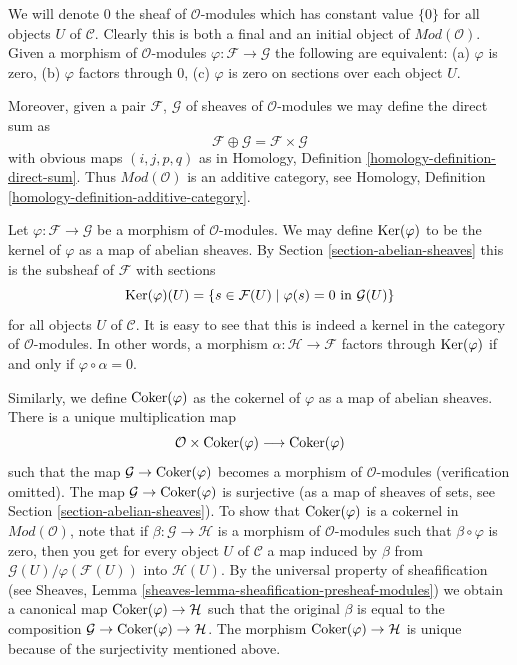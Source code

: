\medskip\noindent
We will denote $0$ the sheaf of $\mathcal{O}$-modules
which has constant value $\{0\}$ for all objects $U$ of $\mathcal{C}$.
Clearly this is both a final and an initial object of
$\textit{Mod}(\mathcal{O})$. Given a morphism
of $\mathcal{O}$-modules $\varphi : \mathcal{F} \to \mathcal{G}$
the following are equivalent:
(a) $\varphi$ is zero, (b) $\varphi$ factors through $0$,
(c) $\varphi$ is zero on sections over each object $U$.

\medskip\noindent
Moreover, given a pair
$\mathcal{F}$, $\mathcal{G}$ of sheaves of $\mathcal{O}$-modules
we may define the direct sum as
$$
\mathcal{F} \oplus \mathcal{G} = \mathcal{F} \times \mathcal{G}
$$
with obvious maps $(i, j, p, q)$ as in Homology, Definition
\ref{homology-definition-direct-sum}. Thus $\textit{Mod}(\mathcal{O})$
is an additive category, see
Homology, Definition \ref{homology-definition-additive-category}.

\medskip\noindent
Let $\varphi : \mathcal{F} \to \mathcal{G}$ be a morphism
of $\mathcal{O}$-modules. We may define $\mathop{\mathrm{Ker}}(\varphi)$
to be the kernel of $\varphi$ as a map of abelian sheaves.
By Section \ref{section-abelian-sheaves} this is the
subsheaf of $\mathcal{F}$ with sections
$$
\mathop{\mathrm{Ker}}(\varphi)(U) =
\{ s \in \mathcal{F}(U) \mid \varphi(s) = 0 \text{ in } \mathcal{G}(U)\}
$$
for all objects $U$ of $\mathcal{C}$. It is easy to see that this is indeed
a kernel in the category of $\mathcal{O}$-modules. In other words,
a morphism $\alpha : \mathcal{H} \to \mathcal{F}$ factors
through $\mathop{\mathrm{Ker}}(\varphi)$ if and only if $\varphi \circ \alpha = 0$.

\medskip\noindent
Similarly, we define $\mathop{\mathrm{Coker}}(\varphi)$ as the cokernel of
$\varphi$ as a map of abelian sheaves. There is a unique
multiplication map
$$
\mathcal{O} \times \mathop{\mathrm{Coker}}(\varphi) \longrightarrow \mathop{\mathrm{Coker}}(\varphi)
$$
such that the map $\mathcal{G} \to \mathop{\mathrm{Coker}}(\varphi)$ becomes a
morphism of $\mathcal{O}$-modules (verification omitted).
The map $\mathcal{G} \to \mathop{\mathrm{Coker}}(\varphi)$ is surjective
(as a map of sheaves of sets, see Section \ref{section-abelian-sheaves}).
To show that $\mathop{\mathrm{Coker}}(\varphi)$ is a cokernel in
$\textit{Mod}(\mathcal{O})$, note that if
$\beta : \mathcal{G} \to \mathcal{H}$ is a morphism of $\mathcal{O}$-modules
such that $\beta \circ \varphi$ is zero, then you get for every
object $U$ of $\mathcal{C}$ a map induced by $\beta$ from
$\mathcal{G}(U)/\varphi(\mathcal{F}(U))$ into $\mathcal{H}(U)$.
By the universal property of sheafification (see
Sheaves, Lemma \ref{sheaves-lemma-sheafification-presheaf-modules})
we obtain a canonical map $\mathop{\mathrm{Coker}}(\varphi) \to \mathcal{H}$
such that the original $\beta$ is equal to the composition
$\mathcal{G} \to \mathop{\mathrm{Coker}}(\varphi) \to \mathcal{H}$.
The morphism $\mathop{\mathrm{Coker}}(\varphi) \to \mathcal{H}$ is unique
because of the surjectivity mentioned above.

